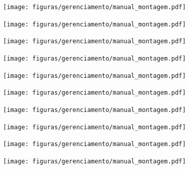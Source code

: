 \begin{apendicesenv}
\begin{figure}[H]
    \centering
    \texttt{[image: figuras/gerenciamento/manual\_montagem.pdf]}
    \label{fig:manual_montagem_4}
\end{figure}

\begin{figure}[H]
    \centering
    \texttt{[image: figuras/gerenciamento/manual\_montagem.pdf]}
    \label{fig:manual_montagem_5}
\end{figure}

\begin{figure}[H]
    \centering
    \texttt{[image: figuras/gerenciamento/manual\_montagem.pdf]}
    \label{fig:manual_montagem_6}
\end{figure}

\begin{figure}[H]
    \centering
    \texttt{[image: figuras/gerenciamento/manual\_montagem.pdf]}
    \label{fig:manual_montagem_7}
\end{figure}

\begin{figure}[H]
    \centering
    \texttt{[image: figuras/gerenciamento/manual\_montagem.pdf]}
    \label{fig:manual_montagem_8}
\end{figure}

\begin{figure}[H]
    \centering
    \texttt{[image: figuras/gerenciamento/manual\_montagem.pdf]}
    \label{fig:manual_montagem_9}
\end{figure}

\begin{figure}[H]
    \centering
    \texttt{[image: figuras/gerenciamento/manual\_montagem.pdf]}
    \label{fig:manual_montagem_10}
\end{figure}

\begin{figure}[H]
    \centering
    \texttt{[image: figuras/gerenciamento/manual\_montagem.pdf]}
    \label{fig:manual_montagem_11}
\end{figure}

\begin{figure}[H]
    \centering
    \texttt{[image: figuras/gerenciamento/manual\_montagem.pdf]}
    \label{fig:manual_montagem_12}
\end{figure}

\begin{figure}[H]
    \centering
    \texttt{[image: figuras/gerenciamento/manual\_montagem.pdf]}
    \label{fig:manual_montagem_13}
\end{figure}


\end{apendicesenv}
